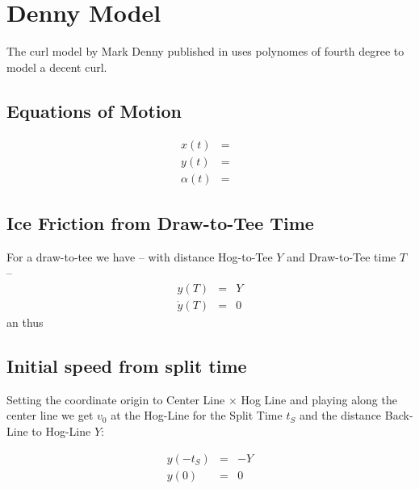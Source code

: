 \section{Denny Model}
The curl model by Mark Denny published in \cite{denny:98} uses polynomes of
fourth degree to model a decent curl.

\subsection{Equations of Motion}
\begin{eqnarray}
x(t) &=&  \\
y(t) &=&  \\
\alpha(t) &=& 
\end{eqnarray}

\subsection{Ice Friction from Draw-to-Tee Time}
For a draw-to-tee we have -- with distance Hog-to-Tee $Y$ and Draw-to-Tee time 
$T$ --
\begin{eqnarray}
y(T) &=& Y \\
\dot y(T) &=& 0
\end{eqnarray}
an thus

\subsection{Initial speed from split time}
Setting the coordinate origin to Center Line $\times$ Hog Line and playing
along the center line we get $v_0$ at the Hog-Line for the Split Time $t_S$ and
the distance Back-Line to Hog-Line $Y$:

\begin{eqnarray}
y(-t_S) &=& -Y \\
y(0) &=& 0 
\end{eqnarray}
